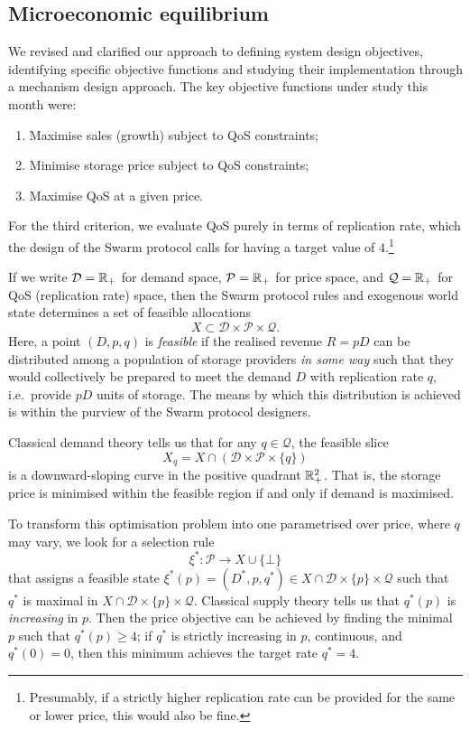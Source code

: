 \subsection*{Microeconomic equilibrium }

We revised and clarified our approach to defining system design objectives, identifying specific objective functions and studying their implementation through a mechanism design approach.
%
The key objective functions under study this month were:
\begin{enumerate}
  \item Maximise sales (growth) subject to QoS constraints;
  \item Minimise storage price subject to QoS constraints;
  \item Maximise QoS at a given price.
\end{enumerate}
For the third criterion, we evaluate QoS purely in terms of replication rate, which the design of the Swarm protocol calls for having a target value of $4$.\footnote{Presumably, if a strictly higher replication rate can be provided for the same or lower price, this would also be fine.}

If we write $\mathcal{D}=\mathbb{R}_+$ for demand space, $\mathcal{P}=\mathbb{R}_+$ for price space, and $\mathcal{Q}=\mathbb{R}_+$ for QoS (replication rate) space, then the Swarm protocol rules and exogenous world state determines a set of feasible allocations
%
\[
  X \subset \mathcal{D}\times\mathcal{P}\times\mathcal{Q}.
\]
%
Here, a point $(D,p,q)$ is \emph{feasible} if the realised revenue $R=pD$ can be distributed among a population of storage providers \emph{in some way} such that they would collectively be prepared to meet the demand $D$ with replication rate $q$, i.e.~provide $pD$ units of storage.
%
The means by which this distribution is achieved is within the purview of the Swarm protocol designers.

Classical demand theory tells us that for any $q\in \mathcal{Q}$, the feasible slice 
\[
  X_q = X \cap (\mathcal{D}\times\mathcal{P}\times\{q\})
\]
is a downward-sloping curve in the positive quadrant $\mathbb{R}_+^2$.
%
That is, the storage price is minimised within the feasible region if and only if demand is maximised.

To transform this optimisation problem into one parametrised over price, where $q$ may vary, we look for a selection rule 
\[
  \xi^*:\mathcal{P}\rightarrow X\cup\{\bot\}
\]
that assigns a feasible state $\xi^*(p)=(D^*,p,q^*)\in X\cap \mathcal{D}\times\{p\}\times\mathcal{Q}$ such that $q^*$ is maximal in $X\cap \mathcal{D}\times\{p\}\times\mathcal{Q}$.
%
Classical supply theory tells us that $q^*(p)$ is \emph{increasing} in $p$. 
%
Then the price objective can be achieved by finding the minimal $p$ such that $q^*(p)\geq 4$; if $q^*$ is strictly increasing in $p$, continuous, and $q^*(0)=0$, then this minimum achieves the target rate $q^*=4$.

